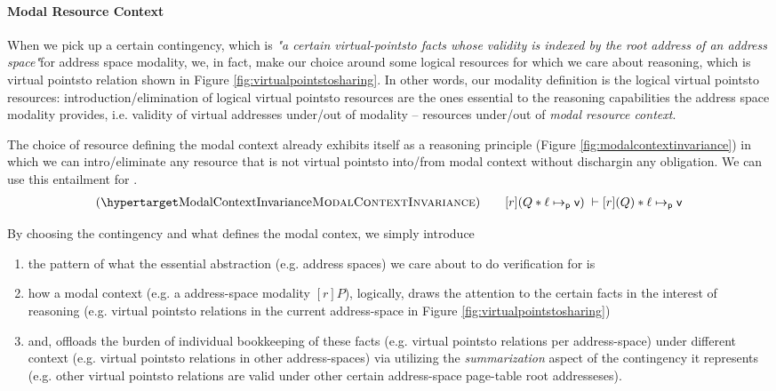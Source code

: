 \paragraph{Modal Resource Context}
\label{sec:resourcecontext}
When we pick up a certain contingency, which is \textit{"a certain virtual-pointsto facts whose validity is indexed by the root address of an address space"}for address space modality, we, in fact, make our choice around some logical resources for which we care about reasoning, which is virtual pointsto relation shown in Figure \ref{fig:virtualpointstosharing}. In other words, our modality definition is the logical virtual pointsto resources: introduction/elimination of logical virtual pointsto resources are the ones essential to the reasoning capabilities the address space modality provides, i.e. validity of virtual addresses under/out of modality -- resources under/out of \textit{modal resource context}.

The choice of resource defining the modal context already exhibits itself as a reasoning principle (Figure \ref{fig:modalcontextinvariance}) in which we can intro/eliminate any resource that is not virtual pointsto into/from modal context without dischargin any obligation. We can use this entailment for  .
  \[
  \begin{array}{l}
\hbox{(\TirNameStyle{ModalContextInvariance})} \qquad
 [r](Q \ast \ell \mapsto_{\textsf{p}} \vpage)  \;\vdash [r](Q) \ast \ell \mapsto_{\textsf{p}} \vpage 
  \end{array}
  \]
\begin{remark}
  \label{remark:pattern}
  By choosing the contingency and what defines the modal contex, we simply introduce 
  \begin{enumerate}
  \item the pattern of what the essential abstraction (e.g. address spaces) we care about to do verification for is
  \item how a modal context (e.g. a address-space modality $[r]P$), logically, draws the attention to the certain facts in the interest of reasoning (e.g. virtual pointsto relations in the current address-space in Figure \ref{fig:virtualpointstosharing})
  \item and, offloads the burden of individual bookkeeping of these facts (e.g. virtual pointsto relations per address-space) under different context (e.g. virtual pointsto relations in other address-spaces) via utilizing the \textit{summarization} aspect of the contingency it represents (e.g. other virtual pointsto relations are valid under other certain address-space page-table root addresseses).  
  \end{enumerate}
\end{remark}
